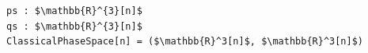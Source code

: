 \documentclass[border=10pt]{standalone}
\begin{document}
\begin{lstlisting}
ps : $\mathbb{R}^{3}[n]$
qs : $\mathbb{R}^{3}[n]$
ClassicalPhaseSpace[n] = ($\mathbb{R}^3[n]$, $\mathbb{R}^3[n]$)
\end{lstlisting}
\end{document}
